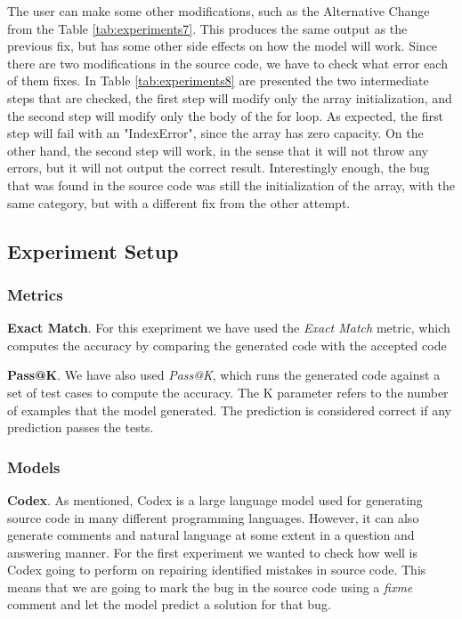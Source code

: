 \documentclass[12pt,a4paper]{report}
\begin{document}
The user can make some other modifications, such as the Alternative Change from the Table \ref{tab:experiments7}. This produces the same output as the previous fix, but has some other side effects on how the model will work. Since there are two modifications in the source code, we have to check what error each of them fixes. In Table \ref{tab:experiments8} are presented the two intermediate steps that are checked, the first step will modify only the array initialization, and the second step will modify only the body of the for loop. As expected, the first step will fail with an "IndexError", since the array has zero capacity. On the other hand, the second step will work, in the sense that it will not throw any errors, but it will not output the correct result. Interestingly enough, the bug that was found in the source code was still the initialization of the array, with the same category, but with a different fix from the other attempt.

\subsection{Experiment Setup}

\subsubsection{Metrics}

\textbf{Exact Match}. For this exepriment we have used the \textit{Exact Match} metric, which computes the accuracy by comparing the generated code with the accepted code

\textbf{Pass@K}. We have also used \textit{Pass@K}, which runs the generated code against a set of test cases to compute the accuracy. The K parameter refers to the number of examples that the model generated. The prediction is considered correct if any prediction passes the tests.

\subsubsection{Models}

\textbf{Codex}. As mentioned, Codex is a large language model used for generating source code in many different programming languages. However, it can also generate comments and natural language at some extent in a question and answering manner. For the first experiment we wanted to check how well is Codex going to perform on repairing identified mistakes in source code. This means that we are going to mark the bug in the source code using a \textit{fixme} comment and let the model predict a solution for that bug. 
\end{document}
